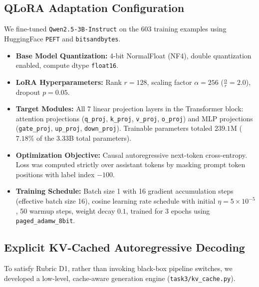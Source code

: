 \documentclass[conference]{IEEEtran}
\begin{document}
\subsection{QLoRA Adaptation Configuration}
We fine-tuned \texttt{Qwen2.5-3B-Instruct} on the 603 training examples using HuggingFace \texttt{PEFT} and \texttt{bitsandbytes}.
\begin{itemize}
    \item \textbf{Base Model Quantization:} 4-bit NormalFloat (NF4), double quantization enabled, compute dtype \texttt{float16}.
    \item \textbf{LoRA Hyperparameters:} Rank $r = 128$, scaling factor $\alpha = 256$ ($\frac{\alpha}{r} = 2.0$), dropout $p = 0.05$.
    \item \textbf{Target Modules:} All 7 linear projection layers in the Transformer block: attention projections (\texttt{q\_proj}, \texttt{k\_proj}, \texttt{v\_proj}, \texttt{o\_proj}) and MLP projections (\texttt{gate\_proj}, \texttt{up\_proj}, \texttt{down\_proj}). Trainable parameters totaled $239.1\text{M}$ ($7.18\%$ of the 3.33B total parameters).
    \item \textbf{Optimization Objective:} Causal autoregressive next-token cross-entropy. Loss was computed strictly over assistant tokens by masking prompt token positions with label index $-100$.
    \item \textbf{Training Schedule:} Batch size 1 with 16 gradient accumulation steps (effective batch size 16), cosine learning rate schedule with initial $\eta = 5 \times 10^{-5}$, 50 warmup steps, weight decay $0.1$, trained for 3 epochs using \texttt{paged\_adamw\_8bit}.
\end{itemize}

\subsection{Explicit KV-Cached Autoregressive Decoding}
To satisfy Rubric D1, rather than invoking black-box pipeline switches, we developed a low-level, cache-aware generation engine (\texttt{task3/kv\_cache.py}). 
\end{document}
